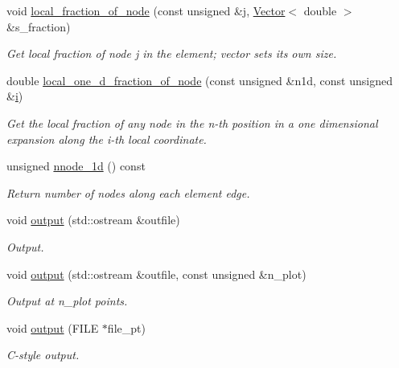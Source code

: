\begin{DoxyCompactItemize}
void \hyperlink{classoomph_1_1QHermiteElement_a7265d98ba824ff594c7eae3b14ebcf46}{local\+\_\+fraction\+\_\+of\+\_\+node} (const unsigned \&j, \hyperlink{classoomph_1_1Vector}{Vector}$<$ double $>$ \&s\+\_\+fraction)
\begin{DoxyCompactList}\small\item\em Get local fraction of node j in the element; vector sets its own size. \end{DoxyCompactList}\item 
double \hyperlink{classoomph_1_1QHermiteElement_a08477703be4ee27e1883f320c098298c}{local\+\_\+one\+\_\+d\+\_\+fraction\+\_\+of\+\_\+node} (const unsigned \&n1d, const unsigned \&\hyperlink{cfortran_8h_adb50e893b86b3e55e751a42eab3cba82}{i})
\begin{DoxyCompactList}\small\item\em Get the local fraction of any node in the n-\/th position in a one dimensional expansion along the i-\/th local coordinate. \end{DoxyCompactList}\item 
unsigned \hyperlink{classoomph_1_1QHermiteElement_a30b57c285bdbe9687cb5cc4771393363}{nnode\+\_\+1d} () const
\begin{DoxyCompactList}\small\item\em Return number of nodes along each element edge. \end{DoxyCompactList}\item 
void \hyperlink{classoomph_1_1QHermiteElement_aed2b691a0b8effb35840561b5112a3af}{output} (std\+::ostream \&outfile)
\begin{DoxyCompactList}\small\item\em Output. \end{DoxyCompactList}\item 
void \hyperlink{classoomph_1_1QHermiteElement_a8053b3b58ea769a5e7be72982d594c0d}{output} (std\+::ostream \&outfile, const unsigned \&n\+\_\+plot)
\begin{DoxyCompactList}\small\item\em Output at n\+\_\+plot points. \end{DoxyCompactList}\item 
void \hyperlink{classoomph_1_1QHermiteElement_ae69bd9e9d2e2e90ff3116995483b87dd}{output} (F\+I\+LE $\ast$file\+\_\+pt)
\begin{DoxyCompactList}\small\item\em C-\/style output. \end{DoxyCompactList}\item 

\end{DoxyCompactItemize}
